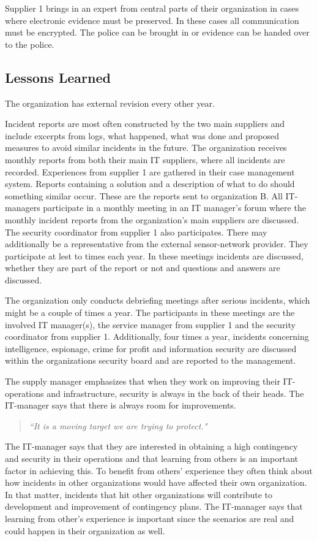 Supplier 1 brings in an expert from central parts of their organization in cases where electronic evidence must be preserved. In these cases all communication must be encrypted. The police can be brought in or evidence can be handed over to the police.

\subsection{Lessons Learned}
The organization has external revision every other year.

Incident reports are most often constructed by the two main suppliers and include excerpts from logs, what happened, what was done and proposed measures to avoid similar incidents in the future. The organization receives monthly reports from both their main IT suppliers, where all incidents are recorded. Experiences from supplier 1 are gathered in their case management system. Reports containing %
a solution and a description of what to do should something similar occur. These are the reports sent to organization B. All IT-managers participate in a monthly meeting in an IT manager's forum where the monthly incident reports from the organization's main suppliers are discussed. The security coordinator from supplier 1 also participates. There may additionally be a representative from the external sensor-network provider. They participate at lest to times each year. In these meetings incidents are discussed, whether they are part of the report or not and questions and answers are discussed.

The organization only conducts debriefing meetings after serious incidents, which might be a couple of times a year. The participants in these meetings are the involved IT manager(s), the service manager from supplier 1 and the security coordinator from supplier 1. Additionally, four times a year, incidents concerning intelligence, espionage, crime for profit and information security are discussed within the organizations security board and are reported to the management. 

The supply manager emphasizes that when they work on improving their IT-operations and infrastructure, security is always in the back of their heads. The IT-manager says that there is always room for improvements. 
\begin{quote}
\textit{``It is a moving target we are trying to protect."}
\end{quote}

The IT-manager says that they are interested in obtaining a high contingency %
and security in their operations and that learning from others is an important factor in achieving this. To benefit from others' experience they often think about how incidents in other organizations would have affected their own organization. In that matter, incidents that hit other organizations will contribute to development and improvement of contingency plans. The IT-manager says that learning from other's experience is important since the scenarios are real and could happen in their organization as well.

